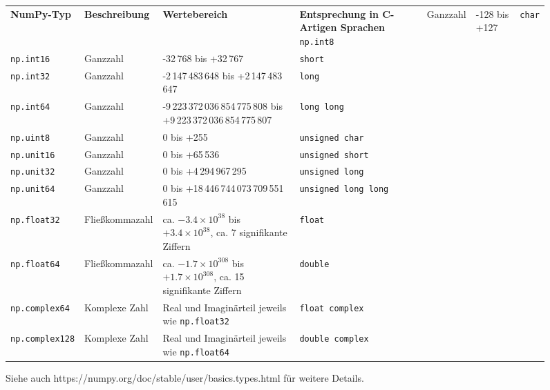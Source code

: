 \begin{figure}[h]  %
\begin{tcolorbox}[title=Übliche NumPy-Datentypen]
\begin{center}
\begin{tabular}{lm{.15\linewidth}m{.3\linewidth}m{.25\linewidth}}
	\textbf{NumPy-Typ}     & \textbf{Beschreibung} & \textbf{Wertebereich} & \textbf{Entsprechung in C-Artigen Sprachen} \tabcrlf
	\texttt{np.int8}       & Ganzzahl & -128 bis +127                                                                            & \texttt{char} \\
	\texttt{np.int16}      & Ganzzahl & -32\,768 bis +32\,767                                                                    & \texttt{short} \\
	\texttt{np.int32}      & Ganzzahl & -2\,147\,483\,648 bis +2\,147\,483\,647                                                  & \texttt{long} \\
	\texttt{np.int64}      & Ganzzahl & -9\,223\,372\,036\,854\,775\,808 bis +9\,223\,372\,036\,854\,775\,807                    & \texttt{long long} \\
	\texttt{np.uint8}      & Ganzzahl & 0 bis +255                                                                               & \texttt{unsigned char} \\
	\texttt{np.unit16}     & Ganzzahl & 0 bis +65\,536                                                                           & \texttt{unsigned short} \\
	\texttt{np.unit32}     & Ganzzahl & 0 bis +4\,294\,967\,295                                                                  & \texttt{unsigned long} \\
	\texttt{np.unit64}     & Ganzzahl & 0 bis +18\,446\,744\,073\,709\,551\,615                                                  & \texttt{unsigned long long}\\
	\texttt{np.float32}    & Fließkommazahl & ca. $-3.4 \times 10^{38}$ bis $+3.4 \times 10^{38}$, ca. 7 signifikante Ziffern    & \texttt{float} \\
	\texttt{np.float64}    & Fließkommazahl & ca. $-1.7 \times 10^{308}$ bis $+1.7 \times 10^{308}$, ca. 15 signifikante Ziffern & \texttt{double}\\
	\texttt{np.complex64}  & Komplexe Zahl & Real und Imaginärteil jeweils wie \texttt{np.float32}                               & \texttt{float complex} \\
	\texttt{np.complex128} & Komplexe Zahl & Real und Imaginärteil jeweils wie \texttt{np.float64}                               & \texttt{double complex}  \\
\end{tabular}
\label{tab:NumPyDataTypes}
Siehe auch {https://numpy.org/doc/stable/user/basics.types.html} für weitere Details.
\end{center}
\end{tcolorbox}
\end{figure}


